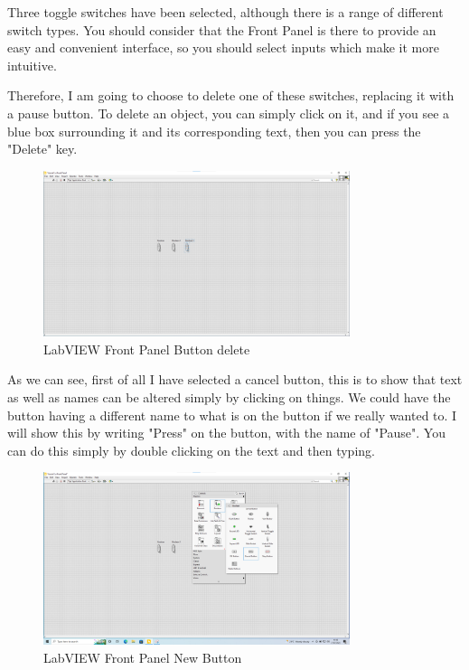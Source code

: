 \documentclass[a4paper,11pt]{report}
\begin{document}
Three toggle switches have been selected, although there is a range of different switch types. You should consider that the Front Panel is there to provide an easy and convenient interface, so you should select inputs which make it more intuitive.

Therefore, I am going to choose to delete one of these switches, replacing it with a pause button. To delete an object, you can simply click on it, and if you see a blue box surrounding it and its corresponding text, then you can press the "Delete" key.

\begin{figure}[H]
\centering
\includegraphics[width=0.8\textwidth]{screenshots/labview12}
\caption{LabVIEW Front Panel Button delete}
\end{figure}

As we can see, first of all I have selected a cancel button, this is to show that text as well as names can be altered simply by clicking on things. We could have the button having a different name to what is on the button if we really wanted to. I will show this by writing "Press" on the button, with the name of "Pause". You can do this simply by double clicking on the text and then typing.

\begin{figure}[H]
\centering
\includegraphics[width=0.8\textwidth]{screenshots/labview13}
\caption{LabVIEW Front Panel New Button}
\end{figure}
\end{document}
